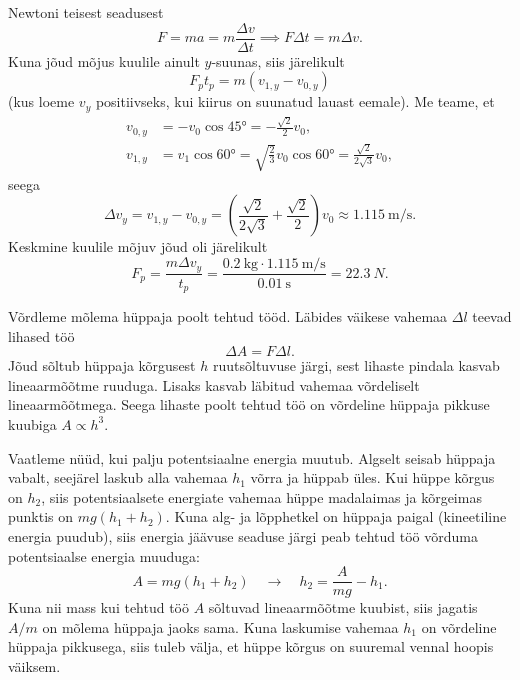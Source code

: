 \documentclass[10pt]{article}
\begin{document}
\osa Newtoni teisest seadusest
\begin{equation*}
    F = ma = m\frac{\Delta v}{\Delta t} \implies F\Delta t = m\Delta v.
\end{equation*}
Kuna jõud mõjus kuulile ainult $y$-suunas, siis järelikult
\begin{equation*}
    F_p t_p = m\left(v_{1,y}-v_{0,y}\right)
\end{equation*}
(kus loeme $v_y$ positiivseks, kui kiirus on suunatud lauast eemale). Me teame, et
\begin{align*}
    v_{0,y} &= -v_0 \cos\ang{45} = -\frac{\sqrt 2}{2}v_0,\\
    v_{1,y} &= v_1 \cos\ang{60} = \sqrt{\frac{2}{3}}v_0\cos\ang{60} = \frac{\sqrt 2}{2\sqrt 3}v_0,
\end{align*}
seega
\begin{equation*}
    \Delta v_y = v_{1,y}-v_{0,y} = \left(\frac{\sqrt 2}{2\sqrt 3} + \frac{\sqrt 2}{2}\right)v_0 \approx \SI{1.115}{\m\per\s}.
\end{equation*}
Keskmine kuulile mõjuv jõud oli järelikult
\begin{equation*}
    F_p = \frac{m\Delta v_y}{t_p} = \frac{\SI{0.2}{\kg}\cdot \SI{1.115}{\m\per\s}}{\SI{0.01}{\s}} = \SI{22.3}{N}.
\end{equation*}
\probend
\bigskip


\solu
Võrdleme mõlema hüppaja poolt tehtud tööd. Läbides väikese vahemaa $\Delta l$ teevad lihased töö
$$\Delta A = F \Delta l.$$
Jõud sõltub hüppaja kõrgusest $h$ ruutsõltuvuse järgi, sest lihaste pindala kasvab lineaarmõõtme ruuduga. Lisaks kasvab läbitud vahemaa võrdeliselt lineaarmõõtmega. Seega lihaste poolt tehtud töö on võrdeline hüppaja pikkuse kuubiga $A \propto h^3$.

Vaatleme nüüd, kui palju potentsiaalne energia muutub. Algselt seisab hüppaja vabalt, seejärel laskub alla vahemaa $h_1$ võrra ja hüppab üles. Kui hüppe kõrgus on $h_2$, siis potentsiaalsete energiate vahemaa hüppe madalaimas ja kõrgeimas punktis on $mg(h_1+h_2)$. Kuna alg- ja lõpphetkel on hüppaja paigal (kineetiline energia puudub), siis energia jäävuse seaduse järgi peab tehtud töö võrduma potentsiaalse energia muuduga:
$$A = mg(h_1+h_2) \quad\rightarrow\quad h_2 = \frac{A}{mg} - h_1.$$
Kuna nii mass kui tehtud töö $A$ sõltuvad lineaarmõõtme kuubist, siis jagatis $A/m$ on mõlema hüppaja jaoks sama. Kuna laskumise vahemaa $h_1$ on võrdeline hüppaja pikkusega, siis tuleb välja, et hüppe kõrgus on suuremal vennal hoopis väiksem.
\probend
\bigskip
\end{document}
